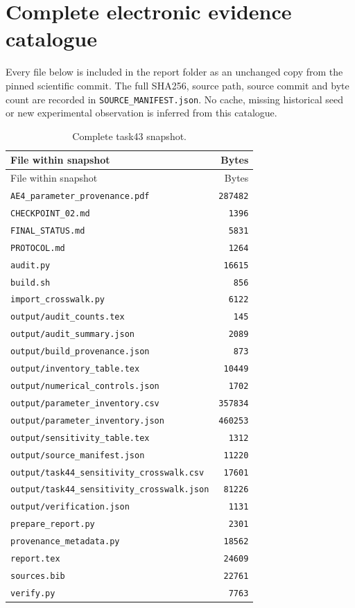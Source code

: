 \section{Complete electronic evidence catalogue}
Every file below is included in the report folder as an unchanged copy from the pinned scientific commit. The full SHA256, source path, source commit and byte count are recorded in \nolinkurl{SOURCE_MANIFEST.json}. No cache, missing historical seed or new experimental observation is inferred from this catalogue.

\begingroup\scriptsize
\setlength{\tabcolsep}{3pt}
\begin{longtable}{p{.78\linewidth}r}
\caption{Complete task43 snapshot.}\\
\toprule
File within snapshot & Bytes \\
\midrule\endfirsthead
\toprule
File within snapshot & Bytes \\
\midrule\endhead
\bottomrule\endfoot
\nolinkurl{AE4_parameter_provenance.pdf} & \texttt{287482} \\
\nolinkurl{CHECKPOINT_02.md} & \texttt{1396} \\
\nolinkurl{FINAL_STATUS.md} & \texttt{5831} \\
\nolinkurl{PROTOCOL.md} & \texttt{1264} \\
\nolinkurl{audit.py} & \texttt{16615} \\
\nolinkurl{build.sh} & \texttt{856} \\
\nolinkurl{import_crosswalk.py} & \texttt{6122} \\
\nolinkurl{output/audit_counts.tex} & \texttt{145} \\
\nolinkurl{output/audit_summary.json} & \texttt{2089} \\
\nolinkurl{output/build_provenance.json} & \texttt{873} \\
\nolinkurl{output/inventory_table.tex} & \texttt{10449} \\
\nolinkurl{output/numerical_controls.json} & \texttt{1702} \\
\nolinkurl{output/parameter_inventory.csv} & \texttt{357834} \\
\nolinkurl{output/parameter_inventory.json} & \texttt{460253} \\
\nolinkurl{output/sensitivity_table.tex} & \texttt{1312} \\
\nolinkurl{output/source_manifest.json} & \texttt{11220} \\
\nolinkurl{output/task44_sensitivity_crosswalk.csv} & \texttt{17601} \\
\nolinkurl{output/task44_sensitivity_crosswalk.json} & \texttt{81226} \\
\nolinkurl{output/verification.json} & \texttt{1131} \\
\nolinkurl{prepare_report.py} & \texttt{2301} \\
\nolinkurl{provenance_metadata.py} & \texttt{18562} \\
\nolinkurl{report.tex} & \texttt{24609} \\
\nolinkurl{sources.bib} & \texttt{22761} \\
\nolinkurl{verify.py} & \texttt{7763} \\
\end{longtable}
\endgroup



